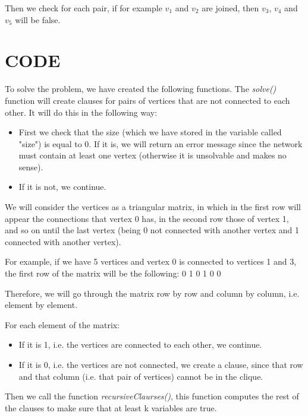 \documentclass[table]{article}
\begin{document}
Then we check for each pair, if for example $v_1$ and $v_2$ are joined, then $v_3$, $v_4$ and $v_5$ will be false.

\leftskip=0.0in  
\section{CODE}

\leftskip=0.5in  
To solve the problem, we have created the following functions.
The \textit{solve()} function will create clauses for pairs of vertices that are not connected to each other. It will do this in the following way: \newline

\begin{itemize}\leftskip=0.8in
\item First we check that the size (which we have stored in the variable called "size") is equal to 0. If it is, we will return an error message since the network must contain at least one vertex (otherwise it is unsolvable and makes no sense).
\item If it is not, we continue.
\end{itemize}
 
\leftskip=0.5in
We will consider the vertices as a triangular matrix, in which in the first row will appear the connections that vertex 0 has, in the second row those of vertex 1, and so on until the last vertex (being 0 not connected with another vertex and 1 connected with another vertex).\newline

For example, if we have 5 vertices and vertex 0 is connected to vertices 1 and 3, the first row of the matrix will be the following: 0 1 0 1 0 0

Therefore, we will go through the matrix row by row and column by column, i.e. element by element. 

For each element of the matrix:

\begin{itemize}\leftskip=0.8in
\item If it is 1, i.e. the vertices are connected to each other, we continue.
\item If it is 0, i.e. the vertices are not connected, we create a clause, since that row and that column (i.e. that pair of vertices) cannot be in the clique.
\end{itemize}

\leftskip=0.5in
Then we call the function \textit{recursiveClaurses()}, this function computes the rest of the clauses to make sure that at least k variables are true.
\end{document}
